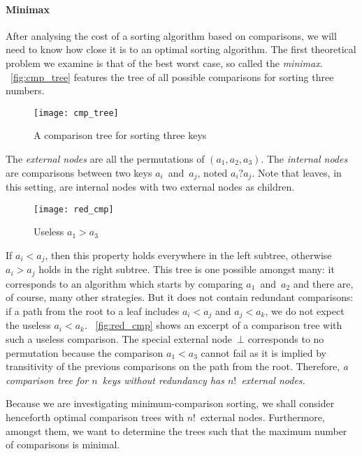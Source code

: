 \paragraph{Minimax}
\label{par:minimax}

After analysing the cost of a sorting algorithm based on comparisons,
we will need to know how close it is to an optimal sorting
algorithm. The first theoretical problem
we examine is that of the best worst case, so called the
\emph{minimax}. \Fig~\vref{fig:cmp_tree}
features the tree of all possible comparisons  for sorting three numbers.
\begin{figure}[t]
\centering
\texttt{[image: cmp\_tree]}
\caption{A comparison tree for sorting three keys}
\label{fig:cmp_tree}
\end{figure}
The \emph{external nodes}\label{def:external_node} are all the
permutations of \((a_1,a_2,a_3)\). The
\emph{internal nodes} are comparisons
between two keys \(a_i\)~and~\(a_j\), noted \(a_i?a_j\). Note that
leaves, in this setting, are internal nodes with two external nodes as
children.

\begin{wrapfigure}[9]{r}[0pt]{0pt}
\centering
\texttt{[image: red\_cmp]}
\caption{Useless \(a_1 > a_3\)}
\label{fig:red_cmp}
\end{wrapfigure}
If \(a_i < a_j\), then this property holds everywhere in the left
subtree, otherwise \(a_i > a_j\) holds in the right subtree. This tree
is one possible amongst many: it corresponds to an algorithm which
starts by comparing \(a_1\)~and~\(a_2\) and there are, of course, many
other strategies. But it does not contain redundant comparisons: if a
path from the root to a leaf includes \(a_i < a_j\) and \(a_j < a_k\),
we do not expect the useless \(a_i < a_k\). \Fig~\vref{fig:red_cmp}
shows an excerpt of a comparison tree with such a useless
comparison. The special external node~\(\bot\) corresponds to no
permutation because the comparison \(a_1 < a_3\) cannot fail as it is
implied by transitivity of the previous comparisons on the path from
the root. Therefore, \emph{a comparison tree for \(n\)~keys without
redundancy has \(n!\)~external nodes.}

Because we are investigating minimum\hyp{}comparison sorting, we shall
consider henceforth optimal comparison trees with \(n!\)~external
nodes. Furthermore, amongst them, we want to determine the trees such
that the maximum number of comparisons is minimal.

